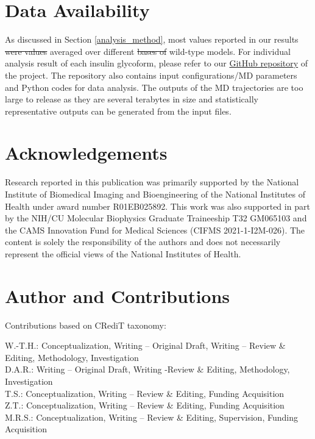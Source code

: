 \documentclass[9pt]{elife}
\providecommand{\DIFaddtex}[1]{{\protect\color{blue}\uwave{#1}}} %
\providecommand{\DIFdeltex}[1]{{\protect\color{red}\sout{#1}}}                      %
\providecommand{\DIFaddbegin}{} %
\providecommand{\DIFaddend}{} %
\providecommand{\DIFdelbegin}{} %
\providecommand{\DIFdelend}{} %
\providecommand{\DIFadd}[1]{\texorpdfstring{\DIFaddtex{#1}}{#1}} %
\providecommand{\DIFdel}[1]{\texorpdfstring{\DIFdeltex{#1}}{}} %
\begin{document}
\section{Data Availability}
As discussed in Section \ref{analysis_method}, most values reported in our results \DIFdelbegin \DIFdel{were values }\DIFdelend \DIFaddbegin \DIFadd{are }\DIFaddend averaged over different \DIFdelbegin \DIFdel{bases of }\DIFdelend wild-type \DIFaddbegin \DIFadd{crystal structure }\DIFaddend models. For individual analysis result of each insulin glycoform, please refer to our \href{https://github.com/shirtsgroup/Glycoinsulin_project}{GitHub repository} of the project. The repository also contains input configurations/MD parameters and Python codes for data analysis. The outputs of the MD trajectories are too large to release as they are several terabytes in size and statistically representative outputs can be generated from the input files.   
\DIFdelbegin %

\DIFdelend \section{Acknowledgements}
Research reported in this publication was primarily supported by the National Institute of Biomedical Imaging and Bioengineering of the National Institutes of Health under award number R01EB025892. This work was also supported in part by the NIH/CU Molecular Biophysics Graduate Traineeship T32 GM065103 and the CAMS Innovation Fund for Medical Sciences (CIFMS 2021-1-I2M-026). The content is solely the responsibility of the authors and does not necessarily represent the official views of the National Institutes of Health.

\section{Author and Contributions}
Contributions based on CRediT taxonomy:

\noindent W.-T.H.: Conceptualization, Writing – Original Draft, Writing – Review \& Editing, Methodology, Investigation \\
D.A.R.: Writing – Original Draft, Writing -Review \& Editing, Methodology, Investigation  \\
T.S.: Conceptualization, Writing – Review \& Editing, Funding Acquisition \\
Z.T.: Conceptualization, Writing – Review \& Editing, Funding Acquisition \\
M.R.S.: Conceptualization, Writing – Review \& Editing, Supervision, Funding Acquisition \\
\end{document}
